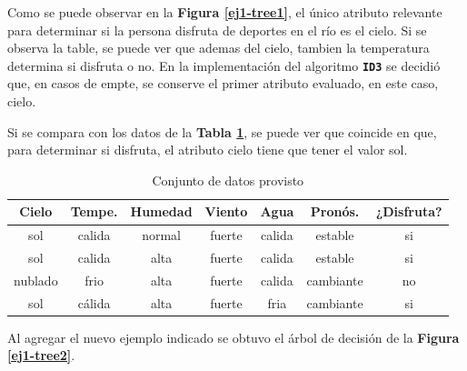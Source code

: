 \documentclass[a4paper]{article}
\newcommand{\bold}[1]{\textbf{\texttt{#1}}}
\newcommand{\reffig}[1]{\textbf{Figura \ref{#1}}}
\newcommand{\reftable}[1]{\textbf{Tabla \ref{#1}}}
\begin{document}
Como se puede observar en la \reffig{ej1-tree1}, el único atributo relevante para determinar si la persona disfruta de deportes en el río es el cielo. Si se observa la table, se puede ver que ademas del cielo, tambien la temperatura determina si disfruta o no. En la implementación del algoritmo \bold{ID3} se decidió que, en casos de empte, se conserve el primer atributo evaluado, en este caso, cielo.

Si se compara con los datos de la \reftable{tab:dataset-1}, se puede ver que coincide en que, para determinar si disfruta, el atributo cielo tiene que tener el valor sol.

\begin{table}[h]
  \centering
  \begin{tabular}{ccccccc}
  Cielo                          & Tempe. & Humedad & Viento & Agua   & Pronós.    & ¿Disfruta?                \\ \hline
  {\color[HTML]{009901} sol}     & calida & normal  & fuerte & calida & estable   & {\color[HTML]{009901} si} \\
  {\color[HTML]{009901} sol}     & calida & alta    & fuerte & calida & estable   & {\color[HTML]{009901} si} \\
  {\color[HTML]{CB0000} nublado} & frio   & alta    & fuerte & calida & cambiante & {\color[HTML]{CB0000} no} \\
  {\color[HTML]{009901} sol}     & cálida & alta    & fuerte & fria   & cambiante & {\color[HTML]{009901} si}
  \end{tabular}
  \caption{Conjunto de datos provisto}
  \label{tab:dataset-1}
  \end{table}

Al agregar el nuevo ejemplo indicado se obtuvo el árbol de decisión de la \reffig{ej1-tree2}.
\end{document}
